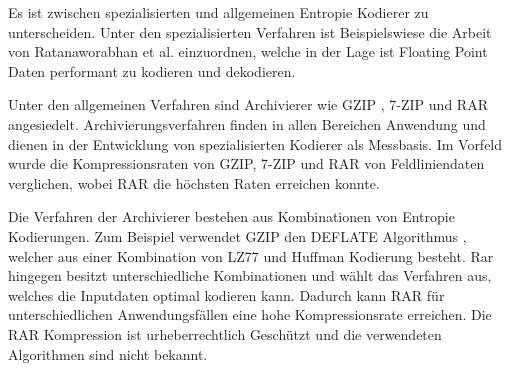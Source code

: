 Es ist zwischen spezialisierten und allgemeinen Entropie Kodierer zu unterscheiden. Unter den spezialisierten Verfahren ist Beispielswiese die Arbeit von Ratanaworabhan et al. \cite{ratanaworabhan2006fast} einzuordnen, welche in der Lage ist Floating Point Daten performant zu kodieren und dekodieren.
 
Unter den allgemeinen Verfahren sind Archivierer wie GZIP \cite{website:gzip}, 7-ZIP \cite{website:7zip} und RAR \cite{website:rar} angesiedelt. Archivierungsverfahren finden in allen Bereichen Anwendung und dienen in der Entwicklung von spezialisierten Kodierer als Messbasis. Im Vorfeld wurde die Kompressionsraten von GZIP, 7-ZIP und RAR von Feldliniendaten verglichen, wobei RAR die höchsten Raten erreichen konnte.

Die Verfahren der Archivierer bestehen aus Kombinationen von Entropie Kodierungen. Zum Beispiel verwendet GZIP den DEFLATE Algorithmus \cite{deutsch1996deflate}, welcher aus einer Kombination von LZ77 \cite{ziv1977universal} und Huffman \cite{huffman1952method} Kodierung besteht. Rar hingegen besitzt unterschiedliche Kombinationen und wählt das Verfahren aus, welches die Inputdaten optimal kodieren kann. Dadurch kann RAR für unterschiedlichen Anwendungsfällen eine hohe Kompressionsrate erreichen. Die RAR Kompression ist urheberrechtlich Geschützt und die verwendeten Algorithmen sind nicht bekannt.
